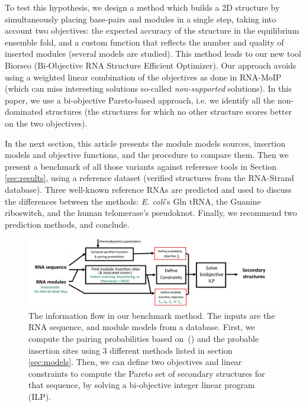 \documentclass{bioinfo}
\begin{document}
To test this hypothesis, we design a method which builds a 2D structure by simultaneously placing base-pairs and modules in a single step, taking into account two objectives: the expected accuracy of the structure in the equilibrium ensemble fold, and a custom function that reflects the number and quality of inserted modules (several models are studied). This method leads to our new tool Biorseo (Bi-Objective RNA Structure Efficient Optimizer). Our approach avoids using a weighted linear combination of the objectives as done in RNA-MoIP (which can miss interesting solutions so-called \textit{non-supported} solutions). In this paper, we use a bi-objective Pareto-based approach, i.e. we identify all the non-dominated structures (the structures for which no other structure scores better on the two objectives).

In the next section, this article presents the module models sources, insertion models and objective functions, and the procedure to compare them. Then we present a benchmark of all those variants against reference tools in Section \ref{sec:results}, using a reference dataset (verified structures from the RNA-Strand database). Three well-known reference RNAs are predicted and used to discuss the differences between the methods: \textit{E. coli}'s Gln tRNA, the Guanine riboswitch, and the human telomerase's pseudoknot. Finally, we recommend two prediction methods, and conclude.

\begin{figure}[t]
   \includegraphics[width=\textwidth]{fig/graph_abstract.jpg} 
   \caption{The information flow in our benchmark method. The inputs are the RNA sequence, and module models from a database. First, we compute the pairing probabilities based on~(\citealp{dirksAlgorithmComputingNucleic2004}) and the probable insertion sites using 3 different methods listed in section \ref{sec:models}. Then, we can define two objectives and linear constraints to compute the Pareto set of secondary structures for that sequence, by solving a bi-objective integer linear program (ILP).}
   \label{fig:pipeline}
\end{figure}
\end{document}
